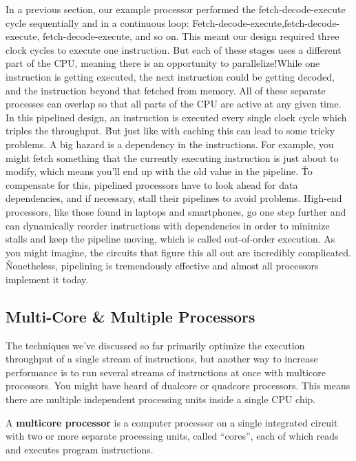 In a previous section, our example processor performed the fetch-decode-execute cycle sequentially and in a
continuous loop: Fetch-decode-execute,fetch-decode-execute, fetch-decode-execute, and so on. This meant our design
required three clock cycles to execute one instruction. But each of these stages uses a different part of the CPU,
meaning there is an opportunity to parallelize!While one instruction is getting executed,  the next instruction could
be getting decoded, and the instruction beyond that fetched from memory. All of these separate processes can overlap
so that all parts of the CPU are active at any given time. In this pipelined design, an instruction is executed every
single clock cycle which triples the throughput. \v

But just like with caching this can lead to some tricky problems. A big hazard is a dependency in the instructions.
For example, you might fetch something that the currently executing instruction is just about to modify, which means
you'll end up with the old value in the pipeline. \v

To compensate for this, pipelined processors have to look ahead for data dependencies, and if necessary, stall their
pipelines to avoid problems. High-end processors, like those found in laptops and smartphones, go one step further
and can dynamically reorder instructions with dependencies in order to minimize stalls and keep the pipeline moving,
which is called out-of-order execution. As you might imagine, the circuits that figure this all out are incredibly
complicated. \v

Nonetheless, pipelining is tremendously effective and almost all processors implement it today.

\subsection{Multi-Core \& Multiple Processors}

The techniques we've discussed so far primarily optimize the execution throughput of a single stream of instructions,
but another way to increase performance is to run several streams of instructions at once with multicore processors.
You might have heard of dualcore or quadcore processors. This means there are multiple independent processing units
inside a single CPU chip.

A \textbf{multicore processor} is a computer processor on a single integrated circuit with two or more separate
processing units, called ``cores'', each of which reads and executes program instructions.
\ed

